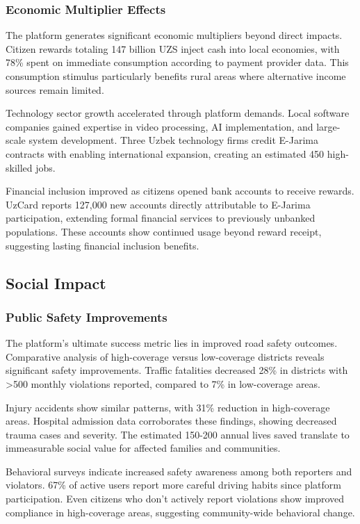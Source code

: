 \documentclass[pdflatex,sn-mathphys-num]{sn-jnl}%
\theoremstyle{thmstyleone}%
\theoremstyle{thmstyletwo}%
\theoremstyle{thmstylethree}%
\begin{document}
\subsubsection{Economic Multiplier Effects}

The platform generates significant economic multipliers beyond direct impacts. Citizen rewards totaling 147 billion UZS inject cash into local economies, with 78\% spent on immediate consumption according to payment provider data. This consumption stimulus particularly benefits rural areas where alternative income sources remain limited.

Technology sector growth accelerated through platform demands. Local software companies gained expertise in video processing, AI implementation, and large-scale system development. Three Uzbek technology firms credit E-Jarima contracts with enabling international expansion, creating an estimated 450 high-skilled jobs.

Financial inclusion improved as citizens opened bank accounts to receive rewards. UzCard reports 127,000 new accounts directly attributable to E-Jarima participation, extending formal financial services to previously unbanked populations. These accounts show continued usage beyond reward receipt, suggesting lasting financial inclusion benefits.

\subsection{Social Impact}\label{subsec18}

\subsubsection{Public Safety Improvements}

The platform's ultimate success metric lies in improved road safety outcomes. Comparative analysis of high-coverage versus low-coverage districts reveals significant safety improvements. Traffic fatalities decreased 28\% in districts with >500 monthly violations reported, compared to 7\% in low-coverage areas.

Injury accidents show similar patterns, with 31\% reduction in high-coverage areas. Hospital admission data corroborates these findings, showing decreased trauma cases and severity. The estimated 150-200 annual lives saved translate to immeasurable social value for affected families and communities.

Behavioral surveys indicate increased safety awareness among both reporters and violators. 67\% of active users report more careful driving habits since platform participation. Even citizens who don't actively report violations show improved compliance in high-coverage areas, suggesting community-wide behavioral change.
\end{document}
